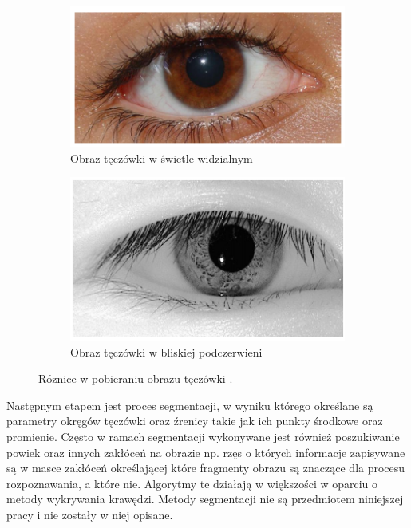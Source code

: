 \begin{figure}[ht]
  \centering
  \begin{subfigure}[b]{0.4\textwidth}
    \centering
    \includegraphics[width=\textwidth]{images/intro/eyeDaylight.png}
    \caption{Obraz tęczówki w świetle widzialnym}
  \end{subfigure}
  \begin{subfigure}[b]{0.4\textwidth}
    \centering
    \includegraphics[width=\textwidth]{images/intro/eyeInfraRed.png}
    \caption{Obraz tęczówki w bliskiej podczerwieni}
  \end{subfigure}
  \caption{Róznice w pobieraniu obrazu tęczówki \cite{IrisRecognitionPresentation}.}
  \label{fig:irisAcquisitionExample}
\end{figure}


Następnym etapem jest proces segmentacji, w wyniku którego określane są parametry okręgów
tęczówki oraz \'zrenicy takie jak ich punkty środkowe oraz promienie. Często w ramach segmentacji
wykonywane jest również poszukiwanie powiek oraz innych zakłóceń na obrazie np. rzęs o których informacje
zapisywane są w masce zakłóceń określającej które fragmenty obrazu są znaczące dla procesu rozpoznawania,
a które nie. Algorytmy te działają w większości w oparciu o metody wykrywania krawędzi.
Metody segmentacji nie są przedmiotem niniejszej pracy i nie zostały w niej opisane.\newline

